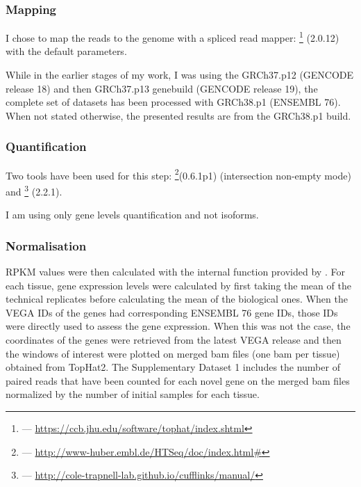\subsubsection{Mapping}
I chose to map the reads to the  genome with a spliced
read mapper: \footnote{ ---
\href{https://ccb.jhu.edu/software/tophat/index.shtml}%
{https://ccb.jhu.edu/software/tophat/index.shtml}} (2.0.12) with the default
parameters.

While in the earlier stages of my work, I was using the GRCh37.p12
(GENCODE release 18) and then GRCh37.p13 genebuild (GENCODE release 19),
the complete set of datasets has been processed with GRCh38.p1 (ENSEMBL 76).
When not stated otherwise, the presented results are from the GRCh38.p1 build.

\subsubsection{Quantification}
Two tools have been used for this step: \footnote{%
 --- \href{http://www-huber.embl.de/HTSeq/doc/index.html\#}%
{http://www-huber.embl.de/HTSeq/doc/index.html\#}}(0.6.1p1) (intersection
non-empty mode) and \footnote{ ---
\href{http://cole-trapnell-lab.github.io/cufflinks/manual/}%
{http://cole-trapnell-lab.github.io/cufflinks/manual/}} (2.2.1).

I am using only gene levels quantification and not isoforms.

\subsubsection{Normalisation}
\gls{RPKM}
values were then calculated with the internal function provided by \irap. For each
tissue, gene expression levels were calculated by first taking the mean of the
technical replicates before calculating the mean of the biological ones. When the
VEGA IDs of the genes had corresponding ENSEMBL 76 gene IDs, those IDs were
directly used to assess the gene expression. When this was not the case, the
coordinates of the genes were retrieved from the latest VEGA release and then the
windows of interest were plotted on merged bam files (one bam per tissue)
obtained from TopHat2. The Supplementary Dataset 1 includes the number of
paired reads that have been counted for each novel gene on the merged bam files
normalized by the number of initial samples for each tissue.



